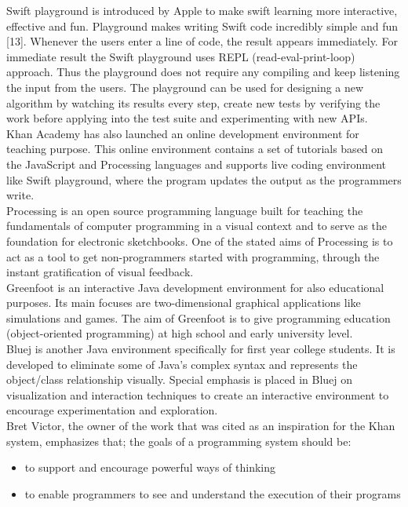 Swift playground is introduced by Apple to make swift learning more interactive, effective and fun. Playground makes writing Swift code incredibly simple and fun [13]. Whenever the users enter a line of code, the result appears immediately. For immediate result the Swift playground uses REPL (read-eval-print-loop) approach. Thus the playground does not require any compiling and keep listening the input from the users. The playground can be used for designing a new algorithm by watching its results every step, create new tests by verifying the work before applying into the test suite and experimenting with new APIs. \\

Khan Academy has also launched an online development environment for teaching purpose. This online environment contains a set of tutorials based on the JavaScript and Processing languages and supports live coding environment like Swift playground, where the program updates the output as the programmers write. \\

Processing is an open source programming language built for teaching the fundamentals of computer programming in a visual context and to serve as the foundation for electronic sketchbooks. One of the stated aims of Processing is to act as a tool to get non-programmers started with programming, through the instant gratification of visual feedback. \\

Greenfoot is an interactive Java development environment for also educational purposes. Its main focuses are two-dimensional graphical applications like simulations and games. The aim of Greenfoot is to give programming education (object-oriented programming) at high school and early university level. \\

Bluej is another Java environment specifically for first year college students. It is developed to eliminate some of Java's complex syntax and represents the object/class relationship visually. Special emphasis is placed in Bluej on visualization and interaction techniques to create an interactive environment to encourage experimentation and exploration. \\

Bret Victor, the owner of the work that was cited as an inspiration for the Khan system, emphasizes that; the goals of a programming system should be: 

\begin{itemize}

\item to support and encourage powerful ways of thinking
\item to enable programmers to see and understand the execution of their programs

\end{itemize}

